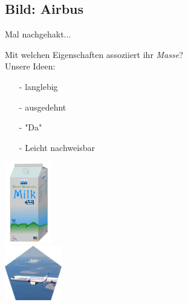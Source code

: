    \subsection{Bild: Airbus}
\begin{frame}{Mal nachgehakt...}
\begin{minipage}{0.1\textwidth}
    \quad
\end{minipage}
            \begin{minipage}[t]{0.49\textwidth}
      \vspace{1cm} 
      Mit welchen Eigenschaften assoziiert ihr \emph{Masse}? \pause \\ Unsere Ideen:
      
      \begin{center}
        \begin{itemize}
             \item[-] langlebig
            \item [-] ausgedehnt
            \item [-]"Da"
            \item [-] Leicht nachweisbar
        \end{itemize}
         \end{center}
      \end{minipage}
      \begin{minipage}[t]{0.29\textwidth}
     \centering
     \vspace{+.1cm}
         \includegraphics[width=2cm]{Figures Lecture on Hadrons/SevenMountainsMilk.png}\\ \vspace{.5cm}
         \includegraphics[width=2.5cm]{Figures Lecture on Hadrons/Airbus A321Neo.jpg}
           \end{minipage} 
 \end{frame}
